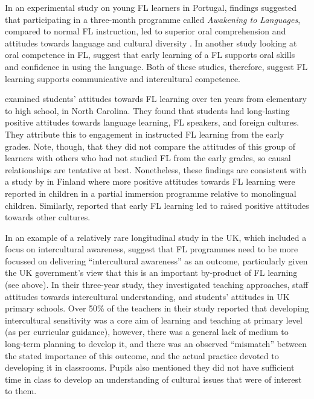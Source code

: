 \documentclass[output=paper]{langscibook}
\begin{document}
In an experimental study on young FL learners in Portugal, findings suggested that participating in a three-month programme called \textit{Awakening to Languages}, compared to normal FL instruction, led to superior oral comprehension and attitudes towards language and cultural diversity \citep{CoelhoEtAl2018}. In another study looking at oral competence in FL, \citet{DominguezPessoa2005} suggest that early learning of a FL supports oral skills and confidence in using the language. Both of these studies, therefore, suggest FL learning supports communicative and intercultural competence.

\citet{HeiningBoyntonHaitema2007} examined students’ attitudes towards FL learning over ten years from elementary to high school, in North Carolina. They found that students had long-lasting positive attitudes towards language learning, FL speakers, and foreign cultures. They attribute this to engagement in instructed FL learning from the early grades. Note, though, that they did not compare the attitudes of this group of learners with others who had not studied FL from the early grades, so causal relationships are tentative at best. Nonetheless, these findings are consistent with a study by \citet{Merisuostorm2007} in Finland where more positive attitudes towards FL learning were reported in children in a partial immersion programme relative to monolingual children. Similarly, \citet{Hood2006} reported that early FL learning led to raised positive attitudes towards other cultures. 

In an example of a relatively rare longitudinal study in the UK, which included a focus on intercultural awareness, \citet{DriscollEtAl2013} suggest that FL programmes need to be more focussed on delivering ``intercultural awareness'' as an outcome, particularly given the UK government’s view that this is an important by-product of FL learning (see above). In their three-year study, they investigated teaching approaches, staff attitudes towards intercultural understanding, and students’ attitudes in UK primary schools. Over 50\% of the teachers in their study reported that developing intercultural sensitivity was a core aim of learning and teaching at primary level (as per curricular guidance), however, there was a general lack of medium to long-term planning to develop it, and there was an observed ``mismatch'' between the stated importance of this outcome, and the actual practice devoted to developing it in classrooms. Pupils also mentioned they did not have sufficient time in class to develop an understanding of cultural issues that were of interest to them. 
\end{document}
